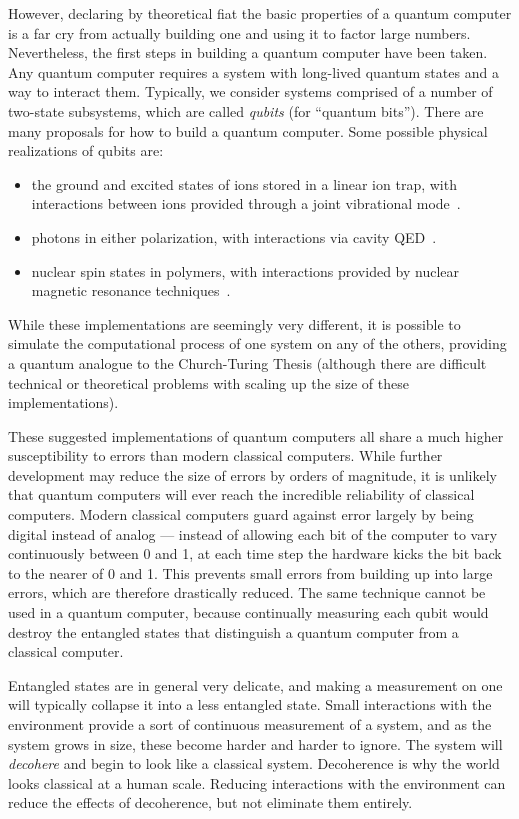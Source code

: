 \documentclass{report}
\begin{document}
However, declaring by theoretical fiat the basic properties of a quantum 
computer is a far cry from actually building one and using it to factor 
large numbers.  Nevertheless, the first steps in building a quantum 
computer have been taken.  Any quantum computer requires a system with
long-lived quantum states and a way to interact them.  Typically, we
consider systems comprised of a number of two-state subsystems, which
are called {\em qubits} (for ``quantum bits'').  There are many proposals 
for how to build a quantum computer.  Some possible physical realizations
of qubits are: 
\begin{itemize}
\item the ground and excited states of ions stored in a linear ion trap, with 
interactions between ions provided through a joint vibrational 
mode~\cite{cirac-zoller,wineland}.
\item photons in either polarization, with interactions via cavity 
QED~\cite{kimble}.
\item nuclear spin states in polymers, with interactions provided by 
nuclear magnetic resonance techniques~\cite{gershenfeld}.
\end{itemize}
While these implementations are seemingly very different, it is 
possible to simulate the computational process of one system on 
any of the others, providing a quantum analogue to the Church-Turing 
Thesis (although there are difficult technical or theoretical problems
with scaling up the size of these implementations).

These suggested implementations of quantum computers all share a 
much higher susceptibility to errors than modern classical computers.  
While further development may reduce the size of errors by orders of 
magnitude, it is unlikely that quantum computers will ever reach the 
incredible reliability of classical computers.  Modern classical computers 
guard against error largely by being digital instead of analog --- instead of 
allowing each bit of the computer to vary continuously between 0 and 1, at 
each time step the hardware kicks the bit back to the nearer of 0 and 1.  
This prevents small errors from building up into large errors, which are 
therefore drastically reduced.  The same technique cannot be used in a 
quantum computer, because continually measuring each qubit would destroy 
the entangled states that distinguish a quantum computer from a classical 
computer.

Entangled states are in general very delicate, and making a measurement on 
one will typically collapse it into a less entangled state.  Small interactions 
with the environment provide a sort of continuous measurement of a system, 
and as the system grows in size, these become harder and harder to ignore.  
The system will {\em decohere} and begin to look like a classical system.  
Decoherence is why the world looks classical at a human scale.  Reducing 
interactions with the environment can reduce the effects of decoherence, 
but not eliminate them entirely.
\end{document}
